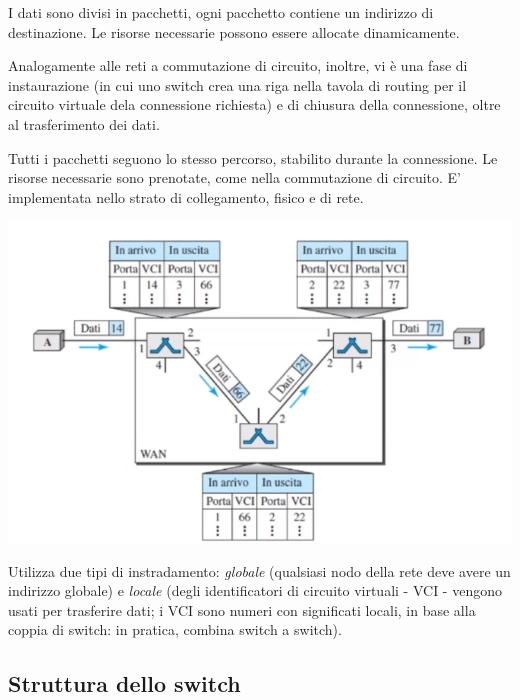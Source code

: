             I dati sono divisi in pacchetti, ogni pacchetto contiene un indirizzo di destinazione. Le risorse necessarie possono essere allocate dinamicamente.
            
            \vspace{3mm}
            
            Analogamente alle reti a commutazione di circuito, inoltre, vi è una fase di instaurazione (in cui uno switch crea una riga nella tavola di routing per il circuito virtuale dela connessione richiesta) e di chiusura della connessione, oltre al trasferimento dei dati. 
            
            Tutti i pacchetti seguono lo stesso percorso, stabilito durante la connessione. Le risorse necessarie sono prenotate, come nella commutazione di circuito. E' implementata nello strato di collegamento, fisico e di rete.
            
            \begin{center}
                \includegraphics[scale=0.5]{images/Tavola-di-Routing.png}
            \end{center}
            
            \vspace{3mm}
            
            Utilizza due tipi di instradamento: \textit{globale} (qualsiasi nodo della rete deve avere un indirizzo globale) e \textit{locale} (degli identificatori di circuito virtuali - VCI - vengono usati per trasferire dati; i VCI sono numeri con significati locali, in base alla coppia di switch: in pratica, combina switch a switch).
            
    \subsection{Struttura dello switch}
    
